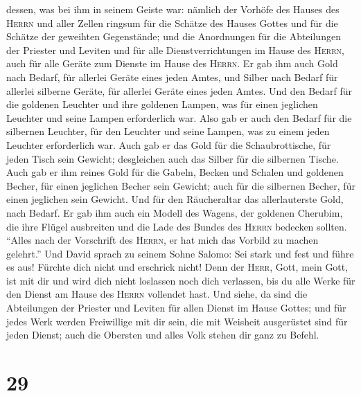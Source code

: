 dessen, was bei ihm in seinem Geiste war: nämlich der Vorhöfe des Hauses
des \textsc{Herrn} und aller Zellen ringsum für die Schätze des Hauses
Gottes und für die Schätze der geweihten Gegenstände; 
und die Anordnungen für die Abteilungen der Priester und Leviten und für
alle Dienstverrichtungen im Hause des \textsc{Herrn}, auch für alle
Geräte zum Dienste im Hause des \textsc{Herrn}.  Er gab
ihm auch Gold nach Bedarf, für allerlei Geräte eines jeden Amtes, und
Silber nach Bedarf für allerlei silberne Geräte, für allerlei Geräte
eines jeden Amtes.  Und den Bedarf für die goldenen
Leuchter und ihre goldenen Lampen, was für einen jeglichen Leuchter und
seine Lampen erforderlich war. Also gab er auch den Bedarf für die
silbernen Leuchter, für den Leuchter und seine Lampen, was zu einem
jeden Leuchter erforderlich war.  Auch gab er das Gold
für die Schaubrottische, für jeden Tisch sein Gewicht; desgleichen auch
das Silber für die silbernen Tische.  Auch gab er ihm
reines Gold für die Gabeln, Becken und Schalen und goldenen Becher, für
einen jeglichen Becher sein Gewicht; auch für die silbernen Becher, für
einen jeglichen sein Gewicht.  Und für den Räucheraltar
das allerlauterste Gold, nach Bedarf. Er gab ihm auch ein Modell des
Wagens, der goldenen Cherubim, die ihre Flügel ausbreiten und die Lade
des Bundes des \textsc{Herrn} bedecken sollten.  ``Alles
nach der Vorschrift des \textsc{Herrn}, er hat mich das Vorbild zu
machen gelehrt.''  Und David sprach zu seinem Sohne
Salomo: Sei stark und fest und führe es aus! Fürchte dich nicht und
erschrick nicht! Denn der \textsc{Herr}, Gott, mein Gott, ist mit dir
und wird dich nicht loslassen noch dich verlassen, bis du alle Werke für
den Dienst am Hause des \textsc{Herrn} vollendet hast. 
Und siehe, da sind die Abteilungen der Priester und Leviten für allen
Dienst im Hause Gottes; und für jedes Werk werden Freiwillige mit dir
sein, die mit Weisheit ausgerüstet sind für jeden Dienst; auch die
Obersten und alles Volk stehen dir ganz zu Befehl.

\hypertarget{section-28}{%
\section{29}\label{section-28}}

